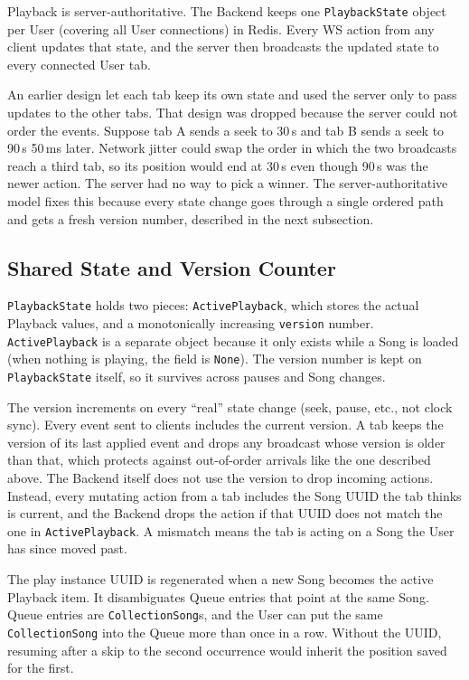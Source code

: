 Playback is server-authoritative. The Backend keeps one
\texttt{PlaybackState} object per User (covering all User connections)
in Redis. Every WS action from any client updates that state, and the
server then broadcasts the updated state to every connected User tab.

An earlier design let each tab keep its own state and used the server
only to pass updates to the other tabs. That design was dropped because
the server could not order the events. Suppose tab A sends a seek to
30\,s and tab B sends a seek to 90\,s 50\,ms later. Network jitter could
swap the order in which the two broadcasts reach a third tab, so its
position would end at 30\,s even though 90\,s was the newer action. The
server had no way to pick a winner. The server-authoritative model fixes
this because every state change goes through a single ordered path and gets
a fresh version number, described in the next subsection.

\subsection{Shared State and Version Counter}
\texttt{PlaybackState} holds two pieces: \texttt{ActivePlayback},
which stores the actual Playback values, and a monotonically
increasing \texttt{version} number. \texttt{ActivePlayback} is a
separate object because it only exists while a Song is loaded (when
nothing is playing, the field is \texttt{None}). The version number
is kept on \texttt{PlaybackState} itself, so it survives across
pauses and Song changes.

The version increments on every ``real'' state change (seek, pause, etc., not clock sync).
Every event sent to clients includes the current version.
A tab keeps the version of its last applied event and drops any broadcast whose version is older than
that, which protects against out-of-order arrivals like the one
described above. The Backend itself does not use the version to drop
incoming actions. Instead, every mutating action from a tab includes
the Song UUID the tab thinks is current, and the Backend drops the
action if that UUID does not match the one in \texttt{ActivePlayback}.
A mismatch means the tab is acting on a Song the User has since moved
past.

The play instance UUID is regenerated when a new Song becomes the
active Playback item. It disambiguates Queue entries that point at the
same Song. Queue entries are \texttt{CollectionSong}s, and the User can
put the same \texttt{CollectionSong} into the Queue more than once in a
row. Without the UUID, resuming after a skip to the second occurrence
would inherit the position saved for the first.

